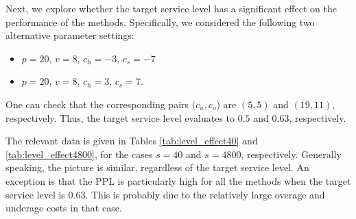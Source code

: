 \documentclass{article}
\begin{document}
Next, we explore whether the target service level has a significant effect on the performance of the methods. Specifically, we considered the following two alternative parameter settings:
\begin{itemize}
    \item $p=20$, $v=8$, $c_h=-3$, $c_s=-7$
    \item $p=20$, $v=8$, $c_h=3$, $c_s=7$.
\end{itemize}
One can check that the corresponding pairs $\big( c_u,c_o \big)$ are $(5,5)$ and $(19,11)$, respectively. Thus, the target service level evaluates to $0.5$ and $0.63$, respectively.

The relevant data is given in Tables \ref{tab:level_effect40} and \ref{tab:level_effect4800}, for the cases $s=40$
and $s=4800$, respectively. Generally speaking, the picture is similar, regardless of the target service level. An exception is that the PPL is particularly high for all the methods when the target service level is 0.63. This is probably due to the relatively large overage and underage costs in that case.

\begin{table}
\caption{Target service level effect on percentage profit loss and service level with 40 data points}
\label{tab:level_effect40}
\centering
{}
\end{table}
\end{document}
